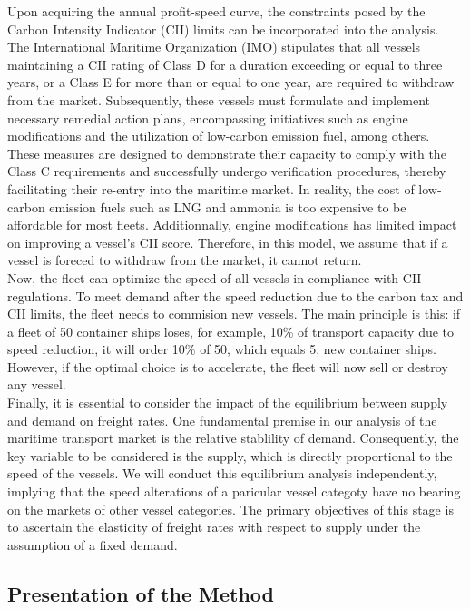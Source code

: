 \documentclass[a4paper,12pt]{article}
\begin{document}
Upon acquiring the annual profit-speed curve, the constraints posed by the Carbon Intensity Indicator (CII) limits can be incorporated into the analysis.
The International Maritime Organization (IMO) stipulates that all vessels maintaining a CII rating of Class D for a duration exceeding or equal to three years, or a Class E for more than or equal to one year, are required to withdraw from the market.
Subsequently, these vessels must formulate and implement necessary remedial action plans, encompassing initiatives such as engine modifications and the utilization of low-carbon emission fuel, among others.
These measures are designed to demonstrate their capacity to comply with the Class C requirements and successfully undergo verification procedures, thereby facilitating their re-entry into the maritime market.
In reality, the cost of low-carbon emission fuels such as LNG and ammonia is too expensive to be affordable for most fleets.
Additionnally, engine modifications has limited impact on improving a vessel's CII score.
Therefore, in this model, we assume that if a vessel is foreced to withdraw from the market, it cannot return.\\

Now, the fleet can optimize the speed of all vessels in compliance with CII regulations.
To meet demand after the speed reduction due to the carbon tax and CII limits, the fleet needs to commision new vessels. 
The main principle is this: if a fleet of 50 container ships loses, for example, 10\% of transport capacity due to speed reduction, it will order 10\% of 50, which equals 5, new container ships. 
However, if the optimal choice is to accelerate, the fleet will now sell or destroy any vessel.\\

Finally, it is essential to consider the impact of the equilibrium between supply and demand on freight rates.
One fundamental premise in our analysis of the maritime transport market is the relative stablility of demand.
Consequently, the key variable to be considered is the supply, which is directly proportional to the speed of the vessels. We will conduct this equilibrium analysis independently, implying that the speed alterations of a paricular vessel categoty have no bearing on the markets of other vessel categories. 
The primary objectives of this stage is to ascertain the elasticity of freight rates with respect to supply under the assumption of a fixed demand.\\


\subsection{Presentation of the Method}
\end{document}
